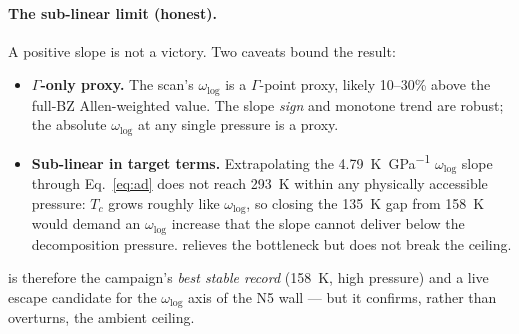 \paragraph{The sub-linear limit (honest).}
A positive slope is not a victory. Two caveats bound the result:
\begin{itemize}\itemsep0.2em
\item \textbf{$\Gamma$-only proxy.} The scan's $\omega_{\log}$ is a
  $\Gamma$-point proxy, likely 10--30\% above the full-BZ
  Allen-weighted value. The slope \emph{sign} and monotone trend are robust;
  the absolute $\omega_{\log}$ at any single pressure is a proxy.
\item \textbf{Sub-linear in target terms.} Extrapolating the
  \SI{4.79}{\kelvin\per\giga\pascal} $\omega_{\log}$ slope through
  Eq.~\eqref{eq:ad} does not reach \SI{293}{\kelvin} within any physically
  accessible pressure: $T_c$ grows roughly like $\omega_{\log}$, so closing
  the \SI{135}{\kelvin} gap from \SI{158}{\kelvin} would demand an
  $\omega_{\log}$ increase that the slope cannot deliver below the
  decomposition pressure.  relieves the bottleneck but does not
  break the ceiling.
\end{itemize}

\noindent {} is therefore the campaign's \emph{best stable record}
(\SI{158}{\kelvin}, high pressure) and a live escape candidate for the
$\omega_{\log}$ axis of the N5 wall --- but it confirms, rather than
overturns, the ambient ceiling.
